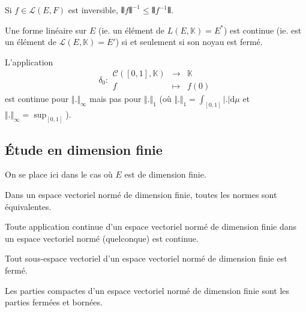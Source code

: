 	\begin{proposition}
		Si $f \in \mathcal{L}(E,F)$ est inversible, $\VERT f \VERT^{-1} \leq \VERT f^{-1} \VERT$.
	\end{proposition}

	\begin{proposition}
		Une forme linéaire sur $E$ (ie. un élément de $L(E, \mathbb{K}) = E^*$) est continue (ie. est un élément de $\mathcal{L}(E, \mathbb{K}) = E'$) si et seulement si son noyau est fermé.
	\end{proposition}


	\begin{example}
		L'application
		\[
		\delta_0 : \begin{array}{ccc}
			\mathcal{C}([0,1], \mathbb{K}) &\rightarrow& \mathbb{K} \\
			f &\mapsto& f(0)
		\end{array}
		\]
		est continue pour $\Vert . \Vert_\infty$ mais pas pour $\Vert . \Vert_1$ (où $\Vert . \Vert_1 = \int_{[0,1]} \vert . \vert \mathrm{d}\mu$ et $\Vert . \Vert_\infty = \sup_{[0,1]}$).
	\end{example}

	\subsection{Étude en dimension finie}

	On se place ici dans le cas où $E$ est de dimension finie.

	\begin{theorem}
		Dans un espace vectoriel normé de dimension finie, toutes les normes sont équivalentes.
	\end{theorem}

	\begin{corollary}
		Toute application continue d'un espace vectoriel normé de dimension finie dans un espace vectoriel normé (quelconque) est continue.
	\end{corollary}

	\begin{corollary}
		Tout sous-espace vectoriel d'un espace vectoriel normé de dimension finie est fermé.
	\end{corollary}

	\begin{corollary}
		Les parties compactes d'un espace vectoriel normé de dimension finie sont les parties fermées et bornées.
	\end{corollary}

